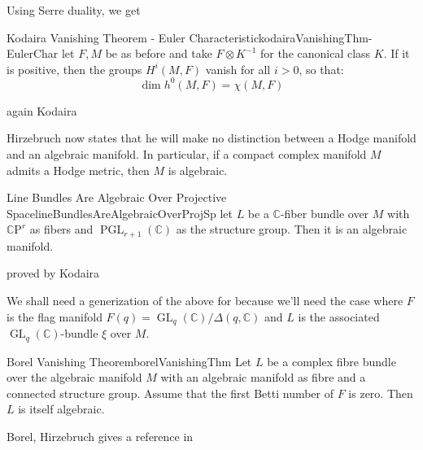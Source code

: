 \documentclass{book}
\newcommand{\C}{{\mathbb{C}}}
\newcommand{\CP}{\mathbb{C}\mathrm{P}}
\newcommand{\GL}{{\operatorname{GL}}}
\newcommand{\PGL}{{\operatorname{PGL}}}
\begin{document}
Using Serre duality, we get

\begin{thm}{Kodaira Vanishing Theorem - Euler Characteristic}{kodairaVanishingThm-EulerChar}
  let $F,M$ be as before and take $F\otimes K^{-1}$ for the canonical class $K$. If it is positive, then the
  groups $H^i(M, F)$ vanish for all $i > 0$, so that:
  \[
    \dim h^0(M, F) = \chi(M, F)
  \]
\end{thm}

\begin{Proof}
  again Kodaira
\end{Proof}


Hirzebruch now states that he will make no distinction between a Hodge manifold and an algebraic manifold. In
particular, if a compact complex manifold $M$ admits a Hodge metric, then $M$ is algebraic.

\begin{thm}{Line Bundles Are Algebraic Over Projective Space}{lineBundlesAreAlgebraicOverProjSp}
  let $L$ be a $\C$-fiber bundle over $M$ with $\CP^r$ as fibers and $\PGL_{r+1}(\C)$ as the structure group.
  Then it is an algebraic manifold.
\end{thm}

\begin{Proof}
  proved by Kodaira
\end{Proof}


We shall need a generization of the above for because we'll need the case where $F$ is the flag manifold $F(q)
= \GL_q(\C)/\Delta(q,\C)$ and $L$ is the associated $\GL_q(\C)$-bundle $\xi$ over $M$.


\begin{thm}{Borel Vanishing Theorem}{borelVanishingThm}
  Let $L$ be a complex fibre bundle over the algebraic manifold $M$ with an algebraic manifold as fibre
  and a connected structure group. Assume that the first Betti number of $F$ is zero. Then $L$ is itself
  algebraic.
\end{thm}

\begin{Proof}
  Borel, Hirzebruch gives a reference in~\cite[p.141]{hirzebruchTopologicalMethodsAlgebraic1995}
\end{Proof}
\end{document}
